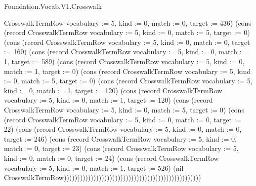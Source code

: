 \begin{lexlean}{Foundation.Vocab.V1.Crosswalk}
\begin{semanticmodule}
{CrosswalkTermRow {vocabulary := 5, kind := 0, match := 0, target := 436}) (cons (record CrosswalkTermRow {vocabulary := 5, kind := 0, match := 5, target := 0}) (cons (record CrosswalkTermRow {vocabulary := 5, kind := 0, match := 0, target := 160}) (cons (record CrosswalkTermRow {vocabulary := 5, kind := 0, match := 1, target := 589}) (cons (record CrosswalkTermRow {vocabulary := 5, kind := 0, match := 1, target := 0}) (cons (record CrosswalkTermRow {vocabulary := 5, kind := 0, match := 5, target := 0}) (cons (record CrosswalkTermRow {vocabulary := 5, kind := 0, match := 1, target := 120}) (cons (record CrosswalkTermRow {vocabulary := 5, kind := 0, match := 1, target := 120}) (cons (record CrosswalkTermRow {vocabulary := 5, kind := 0, match := 5, target := 0}) (cons (record CrosswalkTermRow {vocabulary := 5, kind := 0, match := 0, target := 22}) (cons (record CrosswalkTermRow {vocabulary := 5, kind := 0, match := 0, target := 246}) (cons (record CrosswalkTermRow {vocabulary := 5, kind := 0, match := 0, target := 23}) (cons (record CrosswalkTermRow {vocabulary := 5, kind := 0, match := 0, target := 24}) (cons (record CrosswalkTermRow {vocabulary := 5, kind := 0, match := 1, target := 526}) (nil CrosswalkTermRow)))))))))))))))))))))))))))))))))))))))))))))))))))
}


\end{semanticmodule}
\end{lexlean}
